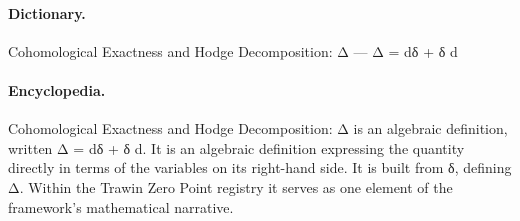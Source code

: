 \paragraph{Dictionary.}
Cohomological Exactness and Hodge Decomposition: Δ — Δ = dδ + δ d

\paragraph{Encyclopedia.}
Cohomological Exactness and Hodge Decomposition: Δ is an algebraic definition, written Δ = dδ + δ d. It is an algebraic definition expressing the quantity directly in terms of the variables on its right-hand side. It is built from δ, defining Δ. Within the Trawin Zero Point registry it serves as one element of the framework's mathematical narrative.
